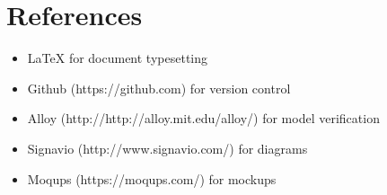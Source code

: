 \chapter{References}
		\begin{itemize}
			\item \LaTeX {  for document typesetting}
			\item Github (https://github.com) for version control
			\item Alloy (http://http://alloy.mit.edu/alloy/) for model verification
			\item Signavio (http://www.signavio.com/) for diagrams
			\item Moqups (https://moqups.com/) for mockups
		\end{itemize}
					
	